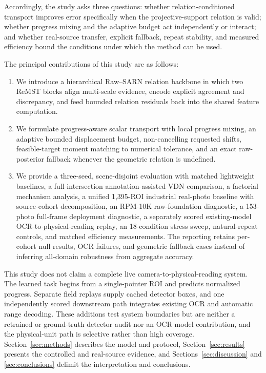 \documentclass[electronics,article,submit,oneauthor]{Definitions/mdpi}
\begin{document}
Accordingly, the study asks three questions: whether relation-conditioned transport improves error specifically when the projective-support relation is valid; whether progress mixing and the adaptive budget act independently or interact; and whether real-source transfer, explicit fallback, repeat stability, and measured efficiency bound the conditions under which the method can be used.

The principal contributions of this study are as follows:
\begin{enumerate}[leftmargin=*]
    \item We introduce a hierarchical Raw--SARN relation backbone in which two ReMST blocks align multi-scale evidence, encode explicit agreement and discrepancy, and feed bounded relation residuals back into the shared feature computation.
    \item We formulate progress-aware scalar transport with local progress mixing, an adaptive bounded displacement budget, non-cancelling requested shifts, feasible-target moment matching to numerical tolerance, and an exact raw-posterior fallback whenever the geometric relation is undefined.
    \item We provide a three-seed, scene-disjoint evaluation with matched lightweight baselines, a full-intersection annotation-assisted VDN comparison, a factorial mechanism analysis, a unified 1,395-ROI industrial real-photo baseline with source-cohort decomposition, an RPM-10K raw-foundation diagnostic, a 153-photo full-frame deployment diagnostic, a separately scored existing-model OCR-to-physical-reading replay, an 18-condition stress sweep, natural-repeat controls, and matched efficiency measurements. The reporting retains per-cohort null results, OCR failures, and geometric fallback cases instead of inferring all-domain robustness from aggregate accuracy.
\end{enumerate}

This study does not claim a complete live camera-to-physical-reading system. The learned task begins from a single-pointer ROI and predicts normalized progress. Separate field replays supply cached detector boxes, and one independently scored downstream path integrates existing OCR and automatic range decoding. These additions test system boundaries but are neither a retrained or ground-truth detector audit nor an OCR model contribution, and the physical-unit path is selective rather than high coverage. Section~\ref{sec:methods} describes the model and protocol, Section~\ref{sec:results} presents the controlled and real-source evidence, and Sections~\ref{sec:discussion} and \ref{sec:conclusions} delimit the interpretation and conclusions.
\end{document}
